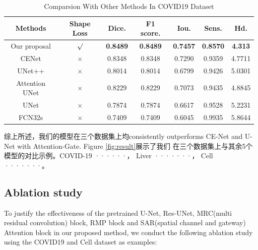 \documentclass[UTF8]{article} %
\begin{document}
  \begin{table}[H]
    \vspace{-2mm}
    \begin{center}\small
    \label{covid19-table}
    \begin{tabular}{ccccccc}
      
    \toprule
    Methods & Shape Loss & Dice. & F1 score. & Iou. & Sens. & Hd.\\
    \midrule
      Our proposal & $\surd$ & \textbf{0.8489} & \textbf{0.8489} & \textbf{0.7457} & \textbf{0.8570} & \textbf{4.313}\\
      CENet & $\times$ & 0.8348 & 0.8348 & 0.7290 & 0.9359 & 4.7711\\
      UNet++ & $\times$ & 0.8014 & 0.8014 & 0.6799 & 0.9426 & 5.0301\\
      Attention UNet & $\times$ & 0.8229 & 0.8229 & 0.7073 & 0.9435 & 4.8845\\
      UNet  & $\times$ & 0.7874 & 0.7874 & 0.6617 & 0.9528 & 5.2231\\
      FCN32s & $\times$ & 0.7409 & 0.7409 & 0.6045 & 0.9935 & 5.8644\\
  \bottomrule    
    \end{tabular}
    \caption{Comparsion With Other Methods In COVID19\cite{covid19_2} Dataset}
  \end{center}
    \vspace{-4mm}
  \end{table}

  综上所述，我们的模型在三个数据集上均consistently outperforms CE-Net and U-Net with Attention-Gate. Figure \ref{fig:result}展示了我们
  在三个数据集上与其余5个模型的对比示例。COVID-19 ······， Liver ·······， Cell ·······。

  \subsection{Ablation study}
  To justify the effectiveness of the pretrained U-Net\cite{unet}, Res-UNet\cite{ResUNet}, 
  MRC(multi residual convolution) block, RMP block and SAR(spatial channel and gateway) Attention block
  in our proposed method, we conduct the following ablation study using the COVID19 and Cell dataset as examples:
\end{document}
